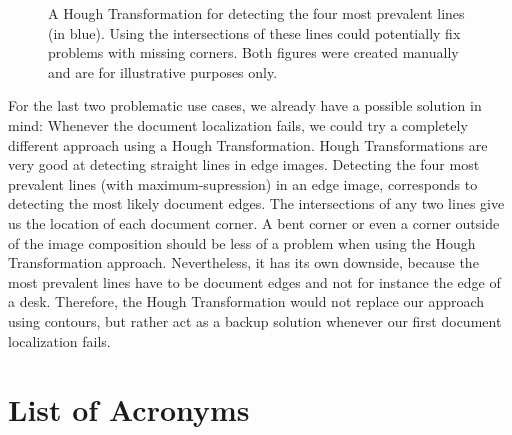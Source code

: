 \documentclass[bibliography=totoc]{scrartcl}
\begin{document}
\begin{figure}[H]
\begin{subfigure}[t]{0.4\linewidth}
	\end{subfigure}
	\caption{A Hough Transformation for detecting the four most prevalent lines (in blue). Using the intersections of these lines could potentially fix problems with missing corners. Both figures were created manually and are for illustrative purposes only.}
	\label{fig:missing_corner_hough}
\end{figure}

For the last two problematic use cases, we already have a possible solution in mind:
Whenever the document localization fails, we could try a completely different approach using a Hough Transformation.
Hough Transformations are very good at detecting straight lines in edge images.
Detecting the four most prevalent lines (with maximum-supression) in an edge image, corresponds to detecting the most likely document edges.
The intersections of any two lines give us the location of each document corner.
A bent corner or even a corner outside of the image composition should be less of a problem when using the Hough Transformation approach.
Nevertheless, it has its own downside, because the most prevalent lines have to be document edges and not for instance the edge of a desk.
Therefore, the Hough Transformation would not replace our approach using contours, but rather act as a backup solution whenever our first document localization fails.

\clearpage
\section*{List of Acronyms}

\begin{acronym}[....]
\end{acronym}


\end{document}
